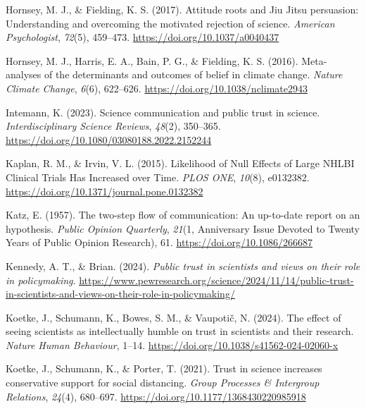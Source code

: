 \documentclass[
  jou,
  floatsintext,
  longtable,
  nolmodern,
  notxfonts,
  notimes,
  colorlinks=true,linkcolor=blue,citecolor=blue,urlcolor=blue]{apa7}
\newlength{\cslhangindent}
\newenvironment{CSLReferences}[2] %
 {\begin{list}{}{%
  \setlength{\itemindent}{0pt}
  \setlength{\leftmargin}{0pt}
  \setlength{\parsep}{0pt}
  \ifodd #1
   \setlength{\leftmargin}{\cslhangindent}
   \setlength{\itemindent}{-1\cslhangindent}
  \fi
  \setlength{\itemsep}{#2\baselineskip}}}
 {\end{list}}
\begin{document}
\begin{CSLReferences}{1}{0}
Hornsey, M. J., \& Fielding, K. S. (2017). Attitude roots and Jiu Jitsu
persuasion: Understanding and overcoming the motivated rejection of
science. \emph{American Psychologist}, \emph{72}(5), 459--473.
\url{https://doi.org/10.1037/a0040437}

Hornsey, M. J., Harris, E. A., Bain, P. G., \& Fielding, K. S. (2016).
Meta-analyses of the determinants and outcomes of belief in climate
change. \emph{Nature Climate Change}, \emph{6}(6), 622--626.
\url{https://doi.org/10.1038/nclimate2943}

Intemann, K. (2023). Science communication and public trust in science.
\emph{Interdisciplinary Science Reviews}, \emph{48}(2), 350--365.
\url{https://doi.org/10.1080/03080188.2022.2152244}

Kaplan, R. M., \& Irvin, V. L. (2015). Likelihood of Null Effects of
Large NHLBI Clinical Trials Has Increased over Time. \emph{PLOS ONE},
\emph{10}(8), e0132382.
\url{https://doi.org/10.1371/journal.pone.0132382}

Katz, E. (1957). The two-step flow of communication: An up-to-date
report on an hypothesis. \emph{Public Opinion Quarterly}, \emph{21}(1,
Anniversary Issue Devoted to Twenty Years of Public Opinion Research),
61. \url{https://doi.org/10.1086/266687}

Kennedy, A. T., \& Brian. (2024). \emph{Public trust in scientists and
views on their role in policymaking}.
\url{https://www.pewresearch.org/science/2024/11/14/public-trust-in-scientists-and-views-on-their-role-in-policymaking/}

Koetke, J., Schumann, K., Bowes, S. M., \& Vaupotič, N. (2024). The
effect of seeing scientists as intellectually humble on trust in
scientists and their research. \emph{Nature Human Behaviour}, 1--14.
\url{https://doi.org/10.1038/s41562-024-02060-x}

Koetke, J., Schumann, K., \& Porter, T. (2021). Trust in science
increases conservative support for social distancing. \emph{Group
Processes \& Intergroup Relations}, \emph{24}(4), 680--697.
\url{https://doi.org/10.1177/1368430220985918}


\end{CSLReferences}
\end{document}
